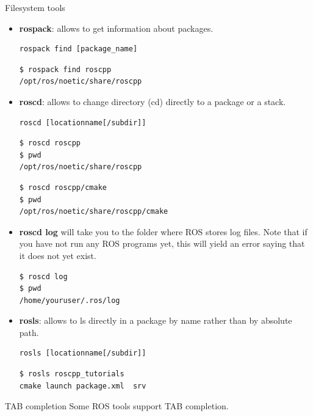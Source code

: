 \begin{frame}{Filesystem tools}
 \begin{itemize}  
  \item \textbf{rospack}: allows to get information about packages.
\begin{lstlisting}[language=syntax]
rospack find [package_name]
\end{lstlisting}
\begin{lstlisting}[language=shell]
$ rospack find roscpp
/opt/ros/noetic/share/roscpp
\end{lstlisting}

  \item \textbf{roscd}: allows to change directory (cd) directly to a package or a stack. 
\begin{lstlisting}[language=syntax]
roscd [locationname[/subdir]]
\end{lstlisting}
\begin{lstlisting}[language=shell]
$ roscd roscpp
$ pwd
/opt/ros/noetic/share/roscpp
\end{lstlisting}
\begin{lstlisting}[language=shell]
$ roscd roscpp/cmake
$ pwd
/opt/ros/noetic/share/roscpp/cmake
\end{lstlisting}

  \item \textbf{roscd log} will take you to the folder where ROS stores log files. Note that if you have not run any ROS programs yet, this will yield an error saying that it does not yet exist. 
\begin{lstlisting}[language=shell]
$ roscd log
$ pwd
/home/youruser/.ros/log
\end{lstlisting}

  \item \textbf{rosls}: allows to ls directly in a package by name rather than by absolute path. 
\begin{lstlisting}[language=syntax]
rosls [locationname[/subdir]]
\end{lstlisting}
\begin{lstlisting}[language=shell]
$ rosls roscpp_tutorials
cmake launch package.xml  srv
\end{lstlisting}
 \end{itemize}

 \begin{alertblock}{TAB completion}
  Some ROS tools support TAB completion.  
 \end{alertblock}
\end{frame}

